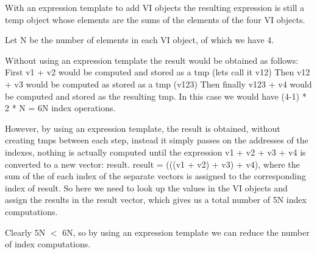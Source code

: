 With an expression template to add VI objects the resulting expression is still a temp object whose elements are the sums of the elements of the four VI objects.

Let N be the number of elements in each VI object, of which we have 4.

Without using an expression template the result would be obtained as follows:
First v1 + v2 would be computed and stored as a tmp (lets call it v12)
Then v12 + v3 would be computed as stored as a tmp (v123)
Then finally v123 + v4 would be computed and stored as the resulting tmp.
In this case we would have (4-1) * 2 * N = 6N index operations.

However, by using an expression template, the result is obtained, without creating tmps between each step, instead it simply passes on the  addresses of the indexes, nothing is actually computed until the expression v1 + v2 + v3 + v4 is converted to a new vector: result.
result = (((v1 + v2)  + v3) + v4), where the sum of the of each index of the separate vectors is assigned to the corresponding index of result.
So here we need to look up the values in the VI objects and assign the results in the result vector, which gives us a total number of 5N index computations.

Clearly 5N $<$ 6N, so by using an expression template we can reduce the number of index computations.
